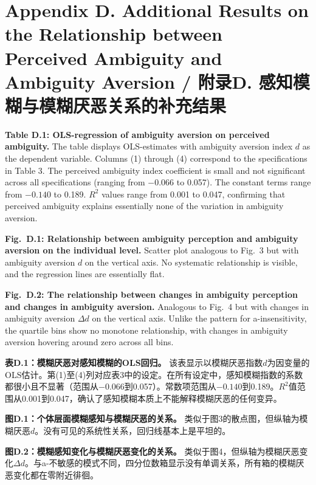 \documentclass[12pt,a4paper]{article}
\newenvironment{original}
  {\par\medskip\noindent\color{black}\ignorespaces}
  {\par\medskip}
\newenvironment{translation}
  {\par\noindent\color{transblue}\ignorespaces}
  {\par\medskip\medskip}
\begin{document}
\newpage
\section*{Appendix D. Additional Results on the Relationship between Perceived Ambiguity and Ambiguity Aversion / 附录D. 感知模糊与模糊厌恶关系的补充结果}

\begin{original}
\textbf{Table D.1: OLS-regression of ambiguity aversion on perceived ambiguity.} The table displays OLS-estimates with ambiguity aversion index $d$ as the dependent variable. Columns (1) through (4) correspond to the specifications in Table 3. The perceived ambiguity index coefficient is small and not significant across all specifications (ranging from $-0.066$ to 0.057). The constant terms range from $-0.140$ to 0.189. $R^2$ values range from 0.001 to 0.047, confirming that perceived ambiguity explains essentially none of the variation in ambiguity aversion.

\textbf{Fig.\ D.1: Relationship between ambiguity perception and ambiguity aversion on the individual level.} Scatter plot analogous to Fig.\ 3 but with ambiguity aversion $d$ on the vertical axis. No systematic relationship is visible, and the regression lines are essentially flat.

\textbf{Fig.\ D.2: The relationship between changes in ambiguity perception and changes in ambiguity aversion.} Analogous to Fig.\ 4 but with changes in ambiguity aversion $\Delta d$ on the vertical axis. Unlike the pattern for a-insensitivity, the quartile bins show no monotone relationship, with changes in ambiguity aversion hovering around zero across all bins.
\end{original}

\begin{translation}
\textbf{表D.1：模糊厌恶对感知模糊的OLS回归。} 该表显示以模糊厌恶指数$d$为因变量的OLS估计。第(1)至(4)列对应表3中的设定。在所有设定中，感知模糊指数的系数都很小且不显著（范围从$-0.066$到0.057）。常数项范围从$-0.140$到0.189。$R^2$值范围从0.001到0.047，确认了感知模糊本质上不能解释模糊厌恶的任何变异。

\textbf{图D.1：个体层面模糊感知与模糊厌恶的关系。} 类似于图3的散点图，但纵轴为模糊厌恶$d$。没有可见的系统性关系，回归线基本上是平坦的。

\textbf{图D.2：模糊感知变化与模糊厌恶变化的关系。} 类似于图4，但纵轴为模糊厌恶变化$\Delta d$。与a-不敏感的模式不同，四分位数箱显示没有单调关系，所有箱的模糊厌恶变化都在零附近徘徊。
\end{translation}
\end{document}
